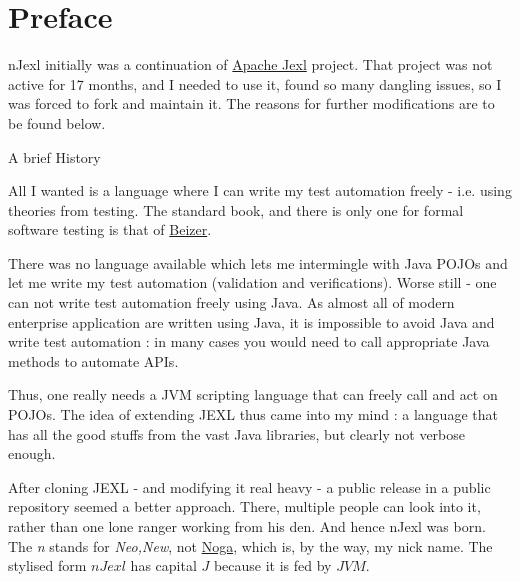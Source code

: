 \chapter{Preface}
 
{\LARGE n}Jexl initially was a continuation of \href{http://commons.apache.org/proper/commons-jexl}{Apache Jexl} project.
That project was not active for 17 months, and I needed to use it, found so many dangling issues, 
so I was forced to fork and maintain it. The reasons for further modifications are to be found below.

\begin{subsection}{A brief History}

All I wanted is a language where I can write my test automation freely - i.e. using theories from testing.
The standard book, and there is only one for formal software testing is 
that of \href{http://www.amazon.com/Software-Testing-Techniques-2nd-Edition/dp/1850328803}{Beizer}.

There was no language available which lets me intermingle with Java POJOs and let me write my test automation (validation and verifications). 
Worse still - one can not write test automation freely using Java. 
As almost all of modern enterprise application are written using Java, it is impossible to avoid Java 
and write test automation : in many cases you would need to call appropriate Java methods to automate APIs.

Thus, one really needs a JVM scripting language that can freely call and act on POJOs.
The idea of extending JEXL thus came into my mind : a language that has all the good stuffs from
the vast Java libraries, but clearly not verbose enough.

After cloning JEXL - and modifying it real heavy - a public release in a public repository
seemed a better approach. There, multiple people can look into it, rather than one lone ranger working from his den.
And hence nJexl was born. The \emph{n} stands for \emph{Neo,New}, 
not \href{https://nmandalh.wordpress.com}{Noga}, which is, by the way, my nick name.
The stylised form $nJexl$ has capital $J$ because it is fed by $JVM$.

\end{subsection}

